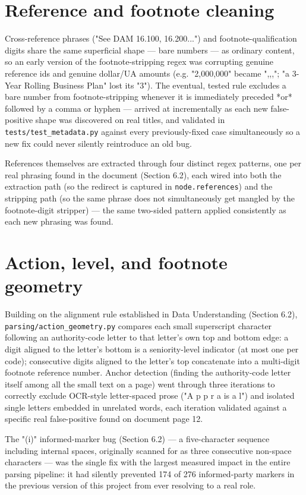 \section{Reference and footnote cleaning}
Cross-reference phrases ("See DAM 16.100, 16.200...") and footnote-qualification digits share the same superficial shape — bare numbers — as ordinary content, so an early version of the footnote-stripping regex was corrupting genuine reference ids and genuine dollar/UA amounts (e.g. "2,000,000" became ",,,"; "a 3-Year Rolling Business Plan" lost its "3"). The eventual, tested rule excludes a bare number from footnote-stripping whenever it is immediately preceded *or* followed by a comma or hyphen — arrived at incrementally as each new false-positive shape was discovered on real titles, and validated in \texttt{tests/\allowbreak{}test\_\allowbreak{}metadata.py} against every previously-fixed case simultaneously so a new fix could never silently reintroduce an old bug.

References themselves are extracted through four distinct regex patterns, one per real phrasing found in the document (Section 6.2), each wired into both the extraction path (so the redirect is captured in \texttt{node.references}) and the stripping path (so the same phrase does not simultaneously get mangled by the footnote-digit stripper) — the same two-sided pattern applied consistently as each new phrasing was found.

\section{Action, level, and footnote geometry}
Building on the alignment rule established in Data Understanding (Section 6.2), \texttt{parsing/\allowbreak{}action\_\allowbreak{}geometry.py} compares each small superscript character following an authority-code letter to that letter's own top and bottom edge: a digit aligned to the letter's bottom is a seniority-level indicator (at most one per code); consecutive digits aligned to the letter's top concatenate into a multi-digit footnote reference number. Anchor detection (finding the authority-code letter itself among all the small text on a page) went through three iterations to correctly exclude OCR-style letter-spaced prose ("A p p r a is a l") and isolated single letters embedded in unrelated words, each iteration validated against a specific real false-positive found on document page 12.

The "(i)" informed-marker bug (Section 6.2) — a five-character sequence including internal spaces, originally scanned for as three consecutive non-space characters — was the single fix with the largest measured impact in the entire parsing pipeline: it had silently prevented 174 of 276 informed-party markers in the previous version of this project from ever resolving to a real role.

